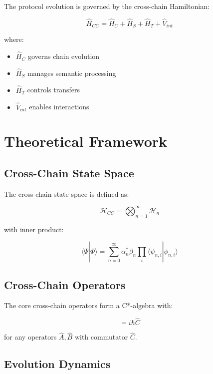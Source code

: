 \documentclass[12pt]{article}
\begin{document}
The protocol evolution is governed by the cross-chain Hamiltonian:

\begin{equation}
\hat{H}_{CC} = \hat{H}_C + \hat{H}_S + \hat{H}_T + \hat{V}_{int}
\end{equation}

where:
\begin{itemize}
\item $\hat{H}_C$ governs chain evolution
\item $\hat{H}_S$ manages semantic processing
\item $\hat{H}_T$ controls transfers
\item $\hat{V}_{int}$ enables interactions
\end{itemize}

\section{Theoretical Framework}

\subsection{Cross-Chain State Space}

The cross-chain state space is defined as:

\begin{equation}
\mathcal{H}_{CC} = \bigotimes_{n=1}^{\infty} \mathcal{H}_n
\end{equation}

with inner product:

\begin{equation}
\langle\Psi|\Phi\rangle = \sum_{n=0}^{\infty} \alpha_n^*\beta_n\prod_i\langle\psi_{n,i}|\phi_{n,i}\rangle
\end{equation}

\subsection{Cross-Chain Operators}

The core cross-chain operators form a C*-algebra with:

\begin{equation}
[\hat{A},\hat{B}] = i\hbar\hat{C}
\end{equation}

for any operators $\hat{A},\hat{B}$ with commutator $\hat{C}$.

\subsection{Evolution Dynamics}
\end{document}
